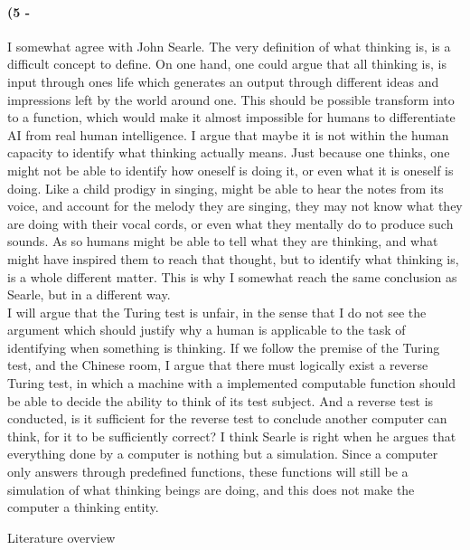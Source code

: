 \documentclass[paper=a4, fontsize=12pt]{scrartcl} %
\numberwithin{equation}{section} %
\numberwithin{figure}{section} %
\numberwithin{table}{section} %
\begin{document}
	\paragraph{(5 -} I somewhat agree with John Searle. The very definition of what thinking is, is a difficult concept to define. On one hand, one could argue that all thinking is, is input through ones life which generates an output through different ideas and impressions left by the world around one. This should be possible transform into to a function, which would make it almost impossible for humans to differentiate AI from real human intelligence. I argue that maybe it is not within the human capacity to identify what thinking actually means. Just because one thinks, one might not be able to identify how oneself is doing it, or even what it is oneself is doing. Like a child prodigy in singing, might be able to hear the notes from its voice, and account for the melody they are singing, they may not know what they are doing with their vocal cords, or even what they mentally do to produce such sounds. As so humans might be able to tell what they are thinking, and what might have inspired them to reach that thought, but to identify what thinking is, is a whole different matter. This is why I somewhat reach the same conclusion as Searle, but in a different way. \\
	I will argue that the Turing test is unfair, in the sense that I do not see the argument which should justify why a human is applicable to the task of identifying when something is thinking. If we follow the premise of the Turing test, and the Chinese room, I argue that there must logically exist a reverse Turing test, in which a machine with a implemented computable function should be able to decide the ability to think of its test subject. And a reverse test is conducted, is it sufficient for the reverse test to conclude another computer can think, for it to be sufficiently correct? I think Searle is right when he argues that everything done by a computer is nothing but a simulation. Since a computer only answers through predefined functions, these functions will still be a simulation of what thinking beings are doing, and this does not make the computer a thinking entity.
	
	
	\newpage
	
	\begin{huge}
		Literature overview
	\end{huge}
	
\end{document}
